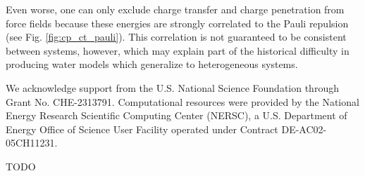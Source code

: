 \documentclass[journal=jctcce,manuscript=article]{achemso}
\begin{document}
Even worse, one can only
exclude charge transfer and charge penetration from force fields because
these energies are strongly correlated to the Pauli repulsion (see Fig. \ref{fig:cp_ct_pauli}).
This correlation is not guaranteed to be consistent between systems, however,
which may explain part of the historical difficulty in producing water models which
generalize to heterogeneous systems.



\begin{acknowledgement}
We acknowledge support from the U.S. National Science Foundation through Grant No. CHE-2313791. Computational resources were provided by the National Energy Research Scientific Computing Center (NERSC), a U.S. Department of Energy Office of Science User Facility operated under Contract DE-AC02-05CH11231.
\end{acknowledgement}

\begin{suppinfo}

TODO

\end{suppinfo}


\end{document}
